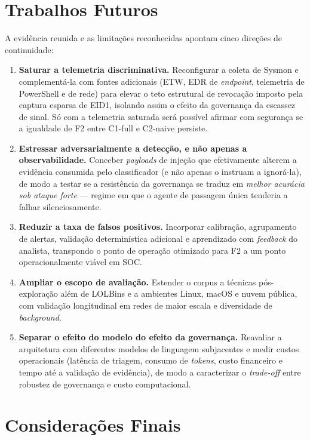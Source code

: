 \section{Trabalhos Futuros}
\label{sec:concl-futuros}

A evidência reunida e as limitações reconhecidas apontam cinco direções de
continuidade:

\begin{enumerate}
    \item \textbf{Saturar a telemetria discriminativa.} Reconfigurar a coleta de
    Sysmon e complementá-la com fontes adicionais (ETW, EDR de
    \textit{endpoint}, telemetria de PowerShell e de rede) para elevar o teto
    estrutural de revocação imposto pela captura esparsa de EID1, isolando assim
    o efeito da governança da escassez de sinal. Só com a telemetria saturada será
    possível afirmar com segurança se a igualdade de F2 entre C1-full e C2-naive
    persiste.
    \item \textbf{Estressar adversarialmente a detecção, e não apenas a
    observabilidade.} Conceber \textit{payloads} de injeção que efetivamente
    alterem a evidência consumida pelo classificador (e não apenas o instruam a
    ignorá-la), de modo a testar se a resistência da governança se traduz em
    \emph{melhor acurácia sob ataque forte} --- regime em que o agente de passagem
    única tenderia a falhar silenciosamente.
    \item \textbf{Reduzir a taxa de falsos positivos.} Incorporar calibração,
    agrupamento de alertas, validação determinística adicional e aprendizado com
    \textit{feedback} do analista, transpondo o ponto de operação otimizado para
    F2 a um ponto operacionalmente viável em SOC.
    \item \textbf{Ampliar o escopo de avaliação.} Estender o corpus a técnicas
    pós-exploração além de LOLBins e a ambientes Linux, macOS e nuvem pública, com
    validação longitudinal em redes de maior escala e diversidade de
    \textit{background}.
    \item \textbf{Separar o efeito do modelo do efeito da governança.} Reavaliar a
    arquitetura com diferentes modelos de linguagem subjacentes e medir custos
    operacionais (latência de triagem, consumo de \textit{tokens}, custo
    financeiro e tempo até a validação de evidência), de modo a caracterizar o
    \textit{trade-off} entre robustez de governança e custo computacional.
\end{enumerate}

\section{Considerações Finais}
\label{sec:concl-finais}

